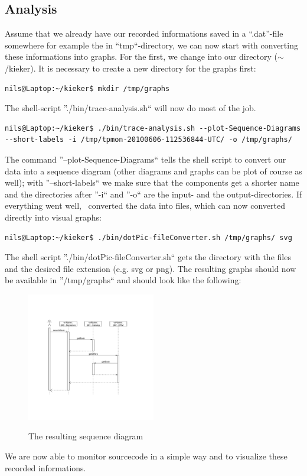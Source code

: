 \documentclass[a4paper, oneside, 11pt]{scrartcl}
\begin{document}
\subsection{Analysis}
Assume that we already have our recorded informations saved in a ``.dat''-file somewhere for example the in ``tmp``-directory, we can now start with converting these informations into graphs. For the first, we change into our \Kieker\-directory ($\sim$/kieker). It is necessary to create a new directory for the graphs first:
\begin{lstlisting}
nils@Laptop:~/kieker$ mkdir /tmp/graphs
\end{lstlisting}
The shell-script ''./bin/trace-analysis.sh`` will now do most of the job.
\begin{lstlisting}
nils@Laptop:~/kieker$ ./bin/trace-analysis.sh --plot-Sequence-Diagrams --short-labels -i /tmp/tpmon-20100606-112536844-UTC/ -o /tmp/graphs/
\end{lstlisting}
The command ''--plot-Sequence-Diagrams`` tells the shell script to convert our data into a sequence diagram (other diagrams and graphs can be plot of course as well); with ''--short-labels`` we make sure that the components get a shorter name and the directories after ''-i`` and ''-o`` are the input- and the output-directories. If everything went well, \Kieker\ converted the data into files, which can now converted directly into visual graphs:
\begin{lstlisting}
nils@Laptop:~/kieker$ ./bin/dotPic-fileConverter.sh /tmp/graphs/ svg
\end{lstlisting}
The shell script ''./bin/dotPic-fileConverter.sh`` gets the directory with the files and the desired file extension (e.g. svg or png). The resulting graphs should now be available in ''/tmp/graphs`` and should look like the following:
\begin{figure}[H]
  \begin{center}
    \includegraphics[width=0.5\textwidth]{sequenceDiagram.pdf}
    \label{image:sequencediagram}
    \caption{The resulting sequence diagram}
  \end{center}
\end{figure}
We are now able to monitor sourcecode in a simple way and to visualize these recorded informations.
\end{document}

